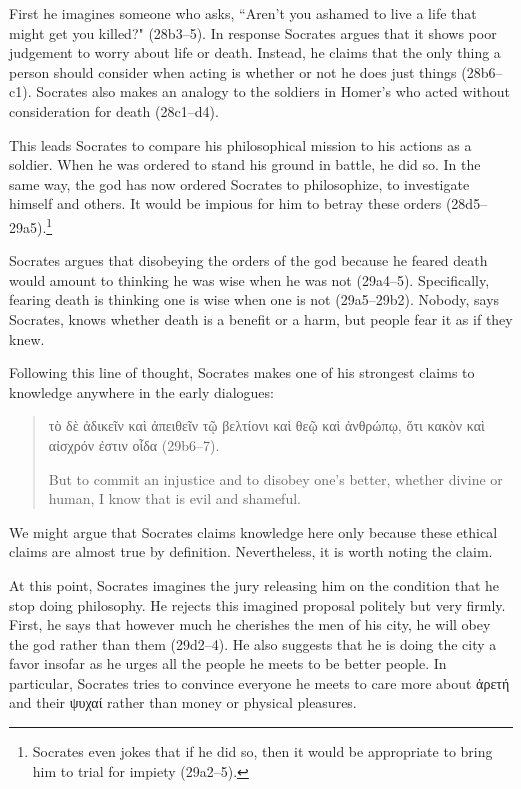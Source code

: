 \documentclass[11pt]{article}
\begin{document}
First he imagines someone who asks, ``Aren't you ashamed to live a life that might get you killed?" (28b3--5).  In response Socrates argues that it shows poor judgement to worry about life or death. Instead, he claims that the only thing a person should consider when acting is whether or not he does just things (28b6--c1).  Socrates also makes an analogy to the soldiers in Homer's  who acted without consideration for death (28c1--d4).

This leads Socrates to compare his philosophical mission to his actions as a soldier.  When he was ordered to stand his ground in battle, he did so.  In the same way, the god has now ordered Socrates to philosophize, to investigate himself and others.  It would be impious for him to betray these orders (28d5--29a5).\footnote{Socrates even jokes that if he did so, then it would be appropriate to bring him to trial for impiety (29a2--5).}

Socrates argues that disobeying the orders of the god because he feared death would amount to thinking he was wise when he was not (29a4--5).  Specifically, fearing death is thinking one is wise when one is not (29a5--29b2).  Nobody, says Socrates, knows whether death is a benefit or a harm, but people fear it as if they knew.

Following this line of thought, Socrates makes one of his strongest claims to knowledge anywhere in the early dialogues:

\begin{quote}
    {\g τὸ δὲ ἀδικεῖν καὶ ἀπειθεῖν τῷ βελτίονι καὶ θεῷ καὶ ἀνθρώπῳ, ὅτι κακὸν καὶ αἰσχρόν ἐστιν οἶδα} (29b6--7).

    But to commit an injustice and to disobey one's better, whether divine or human, I know that is evil and shameful.
\end{quote}

We might argue that Socrates claims knowledge here only because these ethical claims are almost true by definition.  Nevertheless, it is worth noting the claim.

At this point, Socrates imagines the jury releasing him on the condition that he stop doing philosophy.  He rejects this imagined proposal politely but very firmly.  First, he says that however much he cherishes the men of his city, he will obey the god rather than them (29d2--4).  He also suggests that he is doing the city a favor insofar as he urges all the people he meets to be better people.  In particular, Socrates tries to convince everyone he meets to care more about {\g ἀρετή} and their {\g ψυχαί} rather than money or physical pleasures.
\end{document}
